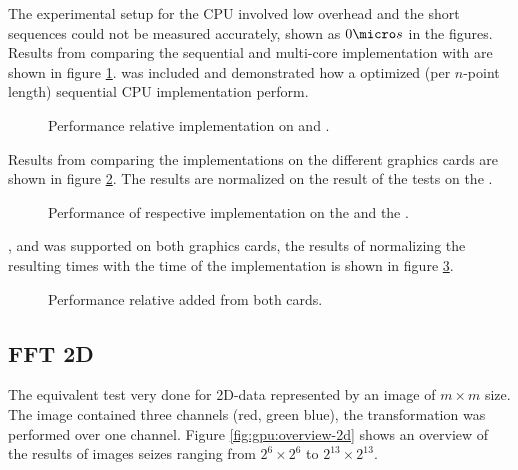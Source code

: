 The experimental setup for the CPU involved low overhead and the short sequences could not be measured accurately, shown as $0{\micro}s$ in the figures. Results from comparing the sequential {\CPP} and multi-core {\OMP} implementation with {\CU} are shown in figure \ref{fig:gtx:cpu}. {\FFTW} was included and demonstrated how a optimized (per $n$-point length) sequential CPU implementation perform.

\begin{figure}[!htbp]
	\centering
	
	\caption{Performance relative {\CU} implementation on {\NVCARD} and {\INTELCPU}.}
	\label{fig:gtx:cpu}
\end{figure}

Results from comparing the implementations on the different graphics cards are shown in figure \ref{fig:gpu-comparison}. The results are normalized on the result of the tests on the {\NVCARD}.

\begin{figure}[!htbp]
	\centering
	
	\caption{Performance of respective implementation on the {\AMDCARD} and the {\NVCARD}.}
	\label{fig:gpu-comparison}
\end{figure}

{\DX}, {\GL} and {\OCL} was supported on both graphics cards, the results of normalizing the resulting times with the time of the {\OCL} implementation is shown in figure \ref{fig:gpu-comparison-tech}.

\begin{figure}[!htbp]
	\centering
	
	\caption{Performance relative {\OCL} added from both cards.}
	\label{fig:gpu-comparison-tech}
\end{figure}


\newpage

\subsection{FFT 2D}

The equivalent test very done for 2D-data represented by an image of $m{\times}m$ size. The image contained three channels (red, green blue), the transformation was performed over one channel. Figure \ref{fig:gpu:overview-2d} shows an overview of the results of images seizes ranging from $2^{6}{\times}2^{6}$ to $2^{13}{\times}2^{13}$.

